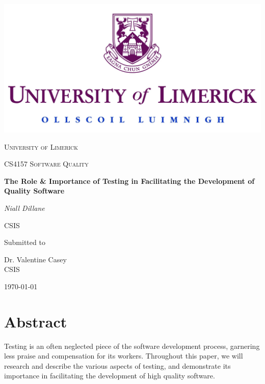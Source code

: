\documentclass[12pt]{article}
\begin{document}
\thispagestyle{empty}
\setlength\headheight{0pt} 
\begin{center}

\begin{center}
\includegraphics[width=0.65\linewidth]{images/UL_logo.jpg}            
\end{center}	

        \vspace{0.25cm}
        {\scshape\LARGE University of Limerick \par}
        \vspace{0.25cm}
        {\scshape\Large CS4157 Software Quality\par}
        \vspace{0.5cm}

        {\Large\bfseries The Role \& Importance of Testing in Facilitating the Development of Quality Software\par}
        
        \vspace{0.5cm}
        {\Large\itshape Niall Dillane\par}
        CSIS
        \vspace{0.25cm}

\vspace{1cm}
Submitted to\par
Dr. Valentine Casey \\
CSIS\par
\vspace{1.5cm}
\large
\today

\end{center}

\clearpage
\restoregeometry
\justify

\section*{Abstract}

Testing is an often neglected piece of the software development process, garnering less praise and compensation for its workers. Throughout this paper, we will research and describe the various aspects of testing, and demonstrate its importance in facilitating the development of high quality software. 
\end{document}
